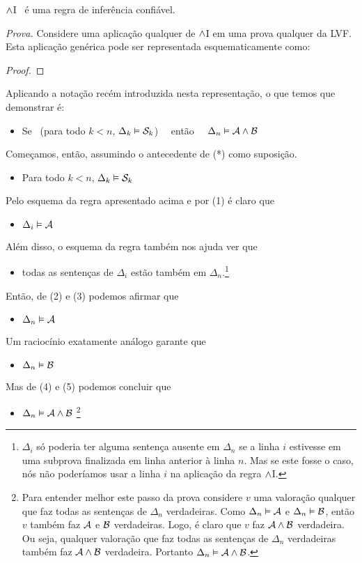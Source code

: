 \begin{factoidboxe}
	$\wedge$I \ é uma regra de inferência confiável.
\end{factoidboxe}

\noindent\emph{Prova.} Considere uma aplicação qualquer de $\wedge$I em uma prova qualquer da LVF.
Esta aplicação genérica pode ser representada esquematicamente como:
\begin{proof}
	 
\end{proof}\noindent
Aplicando a notação recém introduzida nesta representação, o que temos que demonstrar é:
\begin{itemize}
	\item[(*)]  Se  \ ({para todo}  $k<n$, $\Delta_k \vDash \mathcal{S}_k$) \ \ então \ \ $\Delta_n \vDash \mathcal{A} \wedge \mathcal{B}$
\end{itemize}
Começamos, então, assumindo o antecedente de (*) como suposição.
\begin{itemize}
	\item[(1)] Para todo  $k<n$, $\Delta_k \vDash \mathcal{S}_k$
\end{itemize}
Pelo esquema da regra apresentado acima e por (1) é claro que
\begin{itemize}
	\item[(2)] $\Delta_i \vDash \mathcal{A}$
\end{itemize}
Além disso, o esquema da regra também nos ajuda ver que
\begin{itemize}
	\item[(3)] todas as sentenças de $\Delta_i$ estão também em $\Delta_n$.\footnote{
		$\Delta_i$ só poderia ter alguma sentença ausente em $\Delta_n$ se a linha $i$ estivesse em uma subprova finalizada em linha anterior à linha $n$. Mas se este fosse o caso, nós não poderíamos usar a linha $i$ na aplicação da regra $\wedge$I.}
\end{itemize}
Então, de (2) e (3) podemos afirmar que
\begin{itemize}
	\item[(4)] $\Delta_n \vDash \mathcal{A}$
\end{itemize}
Um raciocínio exatamente análogo garante que
\begin{itemize}
	\item[(5)]  $\Delta_n \vDash \mathcal{B}$
\end{itemize}
Mas de (4) e (5) podemos concluir que
\begin{itemize}
	\item[(6)]  $\Delta_n \vDash \mathcal{A} \wedge \mathcal{B}$ \footnote{
		Para entender melhor este passo da prova considere $v$ uma valoração qualquer que faz todas as sentenças de $\Delta_n$ verdadeiras.
		Como $\Delta_n \vDash \mathcal{A}$ e $\Delta_n \vDash \mathcal{B}$, então $v$ também faz $\mathcal{A}$ e $\mathcal{B}$ verdadeiras.
		Logo, é claro que $v$ faz $\mathcal{A} \wedge \mathcal{B}$ verdadeira.
		Ou seja, qualquer valoração que faz todas as sentenças de  $\Delta_n$ verdadeiras também faz $\mathcal{A} \wedge \mathcal{B}$ verdadeira.
		Portanto $\Delta_n \vDash \mathcal{A} \wedge \mathcal{B}$.}
\end{itemize}
